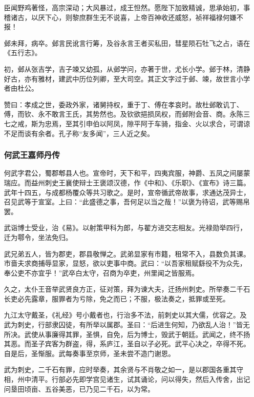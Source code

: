 \documentclass[]{article}
\begin{document}
臣闻野鸡著怪，高宗深动；大风暴过，成王怛然。愿陛下加致精诚，思承始初，事稽诸古，以厌下心，则黎庶群生无不说喜，上帝百神收还威怒，祯祥福禄何嫌不报！

邺未拜，病卒。邺言民讹言行筹，及谷永言王者买私田，彗星陨石牡飞之占，语在《五行志》。

初，邺从张吉学，吉子竦又幼孤，从邺学问，亦著于世，尤长小学。邺于林，清静好古，亦有雅材，建武中历位列卿，至大司空。其正文字过于邺、竦，故世言小学者由杜公。

赞曰：孝成之世，委政外家，诸舅持权，重于丁、傅在孝哀时。故杜邺敢讥丁、傅，而钦、永不敢言王氏，其势然也。及钦欲挹损凤权，而邺附会音、商。永陈三七之戒，斯为忠焉，至其引申伯以阿凤，隙平阿于车骑，指金、火以求合，可谓谅不足而谈有余者。孔子称``友多闻''，三人近之矣。

\hypertarget{header-n5810}{%
\subsubsection{何武王嘉师丹传}\label{header-n5810}}

何武字君公，蜀郡郫县人也。宣帝时，天下和平，四夷宾服，神爵、五凤之间屡蒙瑞应。而益州刺史王襄使辩士王褒颂汉德，作《中和》、《乐职》、《宣布》诗三篇。武年十四五，与成都杨覆众等共习歌之。是时，宣帝循武帝故事，求通达茂异士，召见武等于宣室。上曰：``此盛德之事，吾何足以当之哉！''以褒为待诏，武等赐帛罢。

武诣博士受业，治《易》。以射策甲科为郎，与翟方进交志相友。光禄勋举四行，迁为鄠令，坐法免归。

武兄弟五人，皆为郡吏，郡县敬惮之。武弟显家有市籍，租常不入，县数负其课。市啬夫求商捕辱显家，显怒，欲以吏事中商。武曰：``以吾家租赋繇役不为众先，奉公吏不亦宜乎！''武卒白太守，召商为卒吏，州里闻之皆服焉。

久之，太仆王音举武贤良方正，征对策，拜为谏大夫，迁扬州刺史。所举奏二千石长吏必先露章，服罪者为亏除，免之而已；不服，极法奏之，抵罪或至死。

九江太守戴圣，《礼经》号小戴者也，行治多不法，前刺史以其大儒，优容之。及武为刺史，行部隶囚徒，有所举以属郡。圣曰：``后进生何知，乃欲乱人治！''皆无所决。武使从事廉得其罪，圣惧，自免，后为博士，毁武于朝廷。武闻之，终不扬其恶。而圣子宾客为群盗，得，系庐江，圣自以子必死。武平心决之，卒得不死。自是后，圣惭服。武每奏事至京师，圣未尝不造门谢恩。

武为刺史，二千石有罪，应时举奏，其余贤与不肖敬之如一，是以郡国各重其守相，州中清平。行部必先即学宫见诸生，试其诵论，问以得失，然后入传舍，出记问垦田顷亩、五谷美恶，已乃见二千石，以为常。
\end{document}
